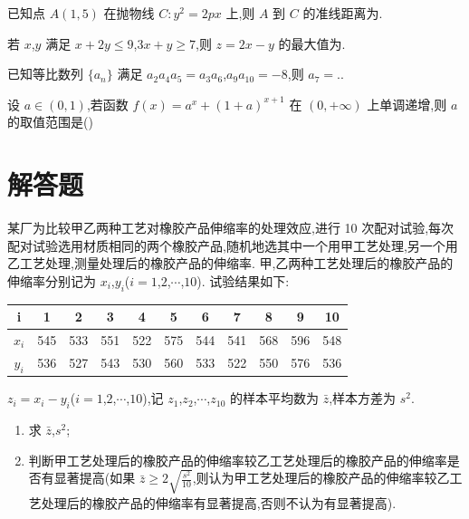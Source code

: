 \begin{problem}
已知点 \(A(1,5)\) 在抛物线 \(C:y^2=2px\) 上,则 \(A\) 到 \(C\) 的准线距离为\fillinblank{}.
\end{problem}

\begin{problem}
若 \(x\),\(y\) 满足 \(x+2y\le 9\),\(3x+y\ge 7\),则 \(z=2x-y\) 的最大值为\fillinblank{}.
\end{problem}

\begin{problem}
已知等比数列 \(\{a_n\}\) 满足 \(a_2a_4a_5=a_3a_6\),\(a_9a_{10}=-8\),则 \(a_7=\)\fillinblank{}.\fillinblank{}.
\end{problem}

\begin{problem}
设 \(a\in(0,1)\),若函数
\(f(x)=a^x+(1+a)^{x+1}\)
在 \((0,+\infty)\) 上单调递增,则 \(a\) 的取值范围是(\quad)
\end{problem}

\section{解答题}

\begin{problem}
某厂为比较甲乙两种工艺对橡胶产品伸缩率的处理效应,进行 10 次配对试验,每次配对试验选用材质相同的两个橡胶产品,随机地选其中一个用甲工艺处理,另一个用乙工艺处理,测量处理后的橡胶产品的伸缩率. 甲,乙两种工艺处理后的橡胶产品的伸缩率分别记为 \(x_i\),\(y_i\)(\(i=1\),\(2\),\(\cdots\),\(10\)). 试验结果如下:

\begin{center}
\begin{tabular}{c|cccccccccc}
i&1&2&3&4&5&6&7&8&9&10\\\hline
\(x_i\)&545&533&551&522&575&544&541&568&596&548\\
\(y_i\)&536&527&543&530&560&533&522&550&576&536
\end{tabular}
\end{center}

\(z_i=x_i-y_i\)(\(i=1\),\(2\),\(\cdots\),\(10\)),记 \(z_1\),\(z_2\),\(\cdots\),\(z_{10}\) 的样本平均数为 \(\bar z\),样本方差为 \(s^2\).

\begin{enumerate}
\item 求 \(\bar z\),\(s^2\);
\item 判断甲工艺处理后的橡胶产品的伸缩率较乙工艺处理后的橡胶产品的伸缩率是否有显著提高(如果 \(\bar z\ge 2\sqrt{\frac{s^2}{10}}\),则认为甲工艺处理后的橡胶产品的伸缩率较乙工艺处理后的橡胶产品的伸缩率有显著提高,否则不认为有显著提高).
\end{enumerate}
\end{problem}

